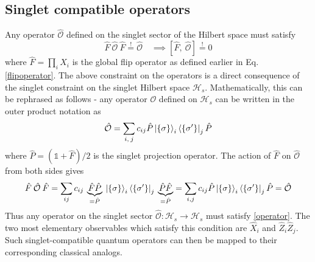 \documentclass[../thesis_main.tex]{subfiles}
\begin{document}
\subsection{Singlet compatible operators}
Any operator $\hat{\mathcal{O}}$ defined on the singlet sector of the Hilbert space must satisfy 
\begin{equation}
    \hat{F} \: \hat{\mathcal{O}} \: \hat{F} \stackrel{!}{=} \hat{\mathcal{O}} \quad \implies [\hat{F}, \: \hat{\mathcal{O}}] \stackrel{!}{=} 0
    \label{operator}
\end{equation}
where $\hat{F} = \prod_i \hat{X}_i$ is the global flip operator as defined earlier in Eq. \ref{flipoperator}. The above constraint on the operators is a direct consequence of the singlet constraint on the singlet Hilbert space $\mathcal{H}_s$. Mathematically, this can be rephrased as follows - any operator $\mathcal{O}$ defined on $\mathcal{H}_s$ can be written in the outer product notation as 
\begin{equation}
    \hat{\mathcal{O}} = \sum_{i,\:j} c_{ij} \hat{P}\ket{\{\sigma\}}_i \bra{\{\sigma '\}}_j \hat{P}
\end{equation}
where $\hat{P} = (\mathds{1} + \hat{F})/2$ is the singlet projection operator. The action of $\hat{F}$ on $\hat{\mathcal{O}}$ from both sides gives   
\begin{equation}
    \hat{F} \: \hat{\mathcal{O}} \: \hat{F} = \sum_{ij} c_{ij} \: \underbrace{\hat{F}\hat{P}}_{ = \hat{P}} \: \ket{\{\sigma\}}_i \bra{\{\sigma '\}}_j \:\underbrace{\hat{P} \hat{F}}_{ = \hat{P}} = \sum_{i,j} c_{ij} \hat{P}\ket{\{\sigma\}}_i \bra{\{\sigma '\}}_j \hat{P} = \hat{\mathcal{O}}
\end{equation}
Thus any operator on the singlet sector $\hat{\mathcal{O}}: \mathcal{H}_s \to \mathcal{H}_s$ must satisfy  \eqref{operator}. The two most elementary observables which satisfy this condition are $\hat{X}_i$ and $\hat{Z}_i \hat{Z}_j$.   Such singlet-compatible quantum operators can then be mapped to their corresponding classical analogs.  
\end{document}
